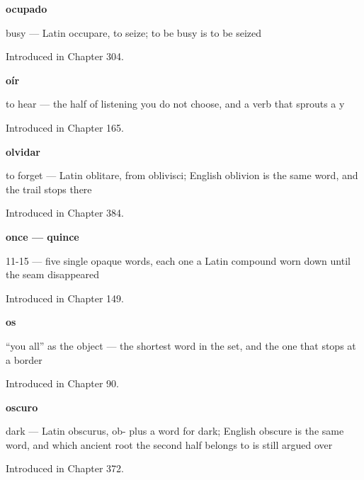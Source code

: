 \noindent\begin{minipage}[t]{\linewidth}
\raggedright
\textbf{ocupado}\par
\small busy — Latin occupare, to seize; to be busy is to be seized\par
\footnotesize Introduced in Chapter 304.
\end{minipage}\par\medskip

\noindent\begin{minipage}[t]{\linewidth}
\raggedright
\textbf{oír}\par
\small to hear — the half of listening you do not choose, and a verb that sprouts a y\par
\footnotesize Introduced in Chapter 165.
\end{minipage}\par\medskip

\noindent\begin{minipage}[t]{\linewidth}
\raggedright
\textbf{olvidar}\par
\small to forget — Latin oblitare, from oblivisci; English oblivion is the same word, and the trail stops there\par
\footnotesize Introduced in Chapter 384.
\end{minipage}\par\medskip

\noindent\begin{minipage}[t]{\linewidth}
\raggedright
\textbf{once — quince}\par
\small 11-15 — five single opaque words, each one a Latin compound worn down until the seam disappeared\par
\footnotesize Introduced in Chapter 149.
\end{minipage}\par\medskip

\noindent\begin{minipage}[t]{\linewidth}
\raggedright
\textbf{os}\par
\small \textquotedblleft{}you all\textquotedblright{} as the object — the shortest word in the set, and the one that stops at a border\par
\footnotesize Introduced in Chapter 90.
\end{minipage}\par\medskip

\noindent\begin{minipage}[t]{\linewidth}
\raggedright
\textbf{oscuro}\par
\small dark — Latin obscurus, ob- plus a word for dark; English obscure is the same word, and which ancient root the second half belongs to is still argued over\par
\footnotesize Introduced in Chapter 372.
\end{minipage}\par\medskip


